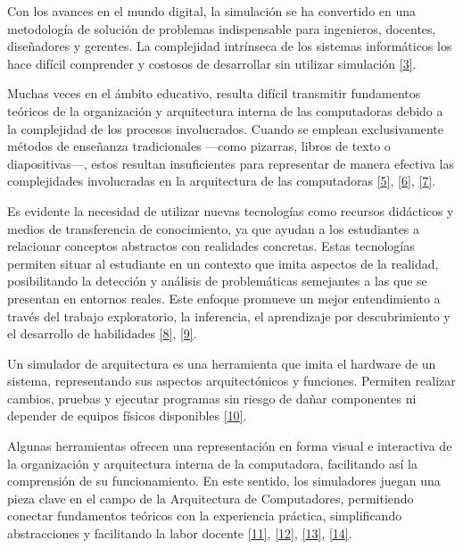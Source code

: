 \documentclass[12pt,oneside]{templates/unerthesis}
\begin{document}
Con los avances en el mundo digital, la simulación se ha convertido en una metodología de solución de problemas indispensable para ingenieros, docentes, diseñadores y gerentes. La complejidad intrínseca de los sistemas informáticos los hace difícil comprender y costosos de desarrollar sin utilizar simulación \protect\hyperlink{ref-law_simulation_2015}{{[}3{]}}.

Muchas veces en el ámbito educativo, resulta difícil transmitir fundamentos teóricos de la organización y arquitectura interna de las computadoras debido a la complejidad de los procesos involucrados. Cuando se emplean exclusivamente métodos de enseñanza tradicionales ---como pizarras, libros de texto o diapositivas---, estos resultan insuficientes para representar de manera efectiva las complejidades involucradas en la arquitectura de las computadoras \protect\hyperlink{ref-lion_simuladores_2005}{{[}5{]}}, \protect\hyperlink{ref-contreras_uso_2010}{{[}6{]}}, \protect\hyperlink{ref-garcia-garcia_pbbcache_2020}{{[}7{]}}.

Es evidente la necesidad de utilizar nuevas tecnologías como recursos didácticos y medios de transferencia de conocimiento, ya que ayudan a los estudiantes a relacionar conceptos abstractos con realidades concretas. Estas tecnologías permiten situar al estudiante en un contexto que imita aspectos de la realidad, posibilitando la detección y análisis de problemáticas semejantes a las que se presentan en entornos reales. Este enfoque promueve un mejor entendimiento a través del trabajo exploratorio, la inferencia, el aprendizaje por descubrimiento y el desarrollo de habilidades \protect\hyperlink{ref-nova_tool_2013}{{[}8{]}}, \protect\hyperlink{ref-mustafa_evaluating_2010}{{[}9{]}}.

Un simulador de arquitectura es una herramienta que imita el hardware de un sistema, representando sus aspectos arquitectónicos y funciones. Permiten realizar cambios, pruebas y ejecutar programas sin riesgo de dañar componentes ni depender de equipos físicos disponibles \protect\hyperlink{ref-radivojevic_design_2011}{{[}10{]}}.

Algunas herramientas ofrecen una representación en forma visual e interactiva de la organización y arquitectura interna de la computadora, facilitando así la comprensión de su funcionamiento. En este sentido, los simuladores juegan una pieza clave en el campo de la Arquitectura de Computadores, permitiendo conectar fundamentos teóricos con la experiencia práctica, simpliﬁcando abstracciones y facilitando la labor docente \protect\hyperlink{ref-nikolic_survey_2009}{{[}11{]}}, \protect\hyperlink{ref-hasan_survey_2012}{{[}12{]}}, \protect\hyperlink{ref-hennessy2017computer}{{[}13{]}}, \protect\hyperlink{ref-stallings_computer_2021}{{[}14{]}}.
\end{document}
